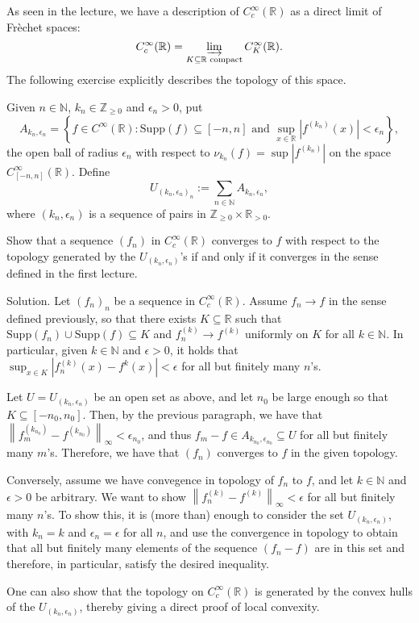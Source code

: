 \documentclass[12pt, reqno,a4paper, twoside]{amsproc}
\newcommand{\supp}{\mathrm{Supp}}
\newcommand{\dbN}{\mathbb N}
\newcommand{\dbZ}{\mathbb Z}
\newcommand{\dbR}{\mathbb R}
\newcommand{\set}[1]{\left\{{#1}\right\}}
\newcommand{\norm}[1]{\left\|#1\right\|}
\newcommand{\abs}[1]{\left|#1\right|}
\newenvironment{sol}{\sc Solution. \rm}{\hfill \qedsymbol\bigskip}
\begin{document}
As seen in the lecture, we have a description of $C_c^\infty(\dbR)$ as a direct limit of Fr\`echet spaces: 
\[C_c^\infty(\dbR)=\varinjlim_{K\subseteq \dbR\text{ compact}}C_K^\infty(\dbR).\]
The following exercise explicitly describes the topology of this space.
\begin{exer}
	Given $n\in\dbN$, $k_n\in\dbZ_{\ge 0}$ and $\epsilon_n>0$, put 
	\[A_{k_n,\epsilon_n}=\set{f\in C^\infty(\dbR):\supp(f)\subseteq[-n,n]\text{ and }\sup_{x\in\dbR}\abs{f^{(k_n)}(x)}<\epsilon_n},\]
	the open ball of radius $\epsilon_n$ with respect to $\nu_{k_n}(f)=\sup\abs{f^{(k_n)}}$ on the space $C_{[-n,n]}^\infty(\dbR)$.
	Define
		\[U_{(k_n,\epsilon_n)_n}:=\sum_{n\in\dbN} A_{k_n,\epsilon_n},\]
	where $(k_n,\epsilon_n)$ is a sequence of pairs in $\dbZ_{\ge 0}\times \dbR_{>0}$.
	 
	Show that a sequence $(f_n)$ in $C_c^\infty(\dbR)$ converges to $f$ with respect to the topology generated by the $U_{(k_n,\epsilon_n)}$'s if and only if it converges in the sense defined in the first lecture.
\end{exer}
\begin{sol}
	Let $(f_n)_n$ be a sequence in $C_c^\infty(\dbR)$. Assume $f_n\to f$ in the sense defined previously, so that there exists $K\subseteq \dbR$ such that $\supp(f_n)\cup\supp(f)\subseteq K$ and $f_n^{(k)}\to f^{(k)}$ uniformly on $K$ for all $k\in\dbN$. In particular, given $k\in\dbN$ and $\epsilon>0$, it holds that $\sup_{x\in K}\abs{f^{(k)}_n(x)-f^{k}(x)}<\epsilon$ for all but finitely many $n$'s. 
	
	Let $U=U_{(k_n,\epsilon_n)}$ be an open set as above, and let $n_0$ be large enough so that $K\subseteq [-n_0,n_0]$. Then, by the previous paragraph, we have that $\norm{f^{(k_{n_0})}_m-f^{(k_{n_0})}}_\infty<\epsilon_{n_0}$, and thus $f_m-f\in A_{k_{n_0},\epsilon_{n_0}}\subseteq U$ for all but finitely many $m$'s. Therefore, we have that $(f_n)$ converges to $f$ in the given topology.
	
	Conversely, assume we have convegence in topology of $f_n$ to $f$, and let $k\in\dbN$ and $\epsilon>0$ be arbitrary. We want to show $\norm{f^{(k)}_n-f^{(k)}}_{\infty}<\epsilon$ for all but finitely many $n$'s. To show this, it is (more than) enough to consider the set $U_{(k_n,\epsilon_n)}$, with $k_n=k$ and $\epsilon_n=\epsilon$ for all $n$, and use the convergence in topology to obtain that all but finitely many elements of the sequence $(f_n-f)$ are in this set and therefore, in particular, satisfy the desired inequality.
\end{sol}
\begin{rem}
	One can also show that the topology on $C_c^\infty(\dbR)$ is generated by the convex hulls of the $U_{(k_n,\epsilon_n)}$, thereby giving a direct proof of local convexity.
\end{rem}
	
\end{document}
